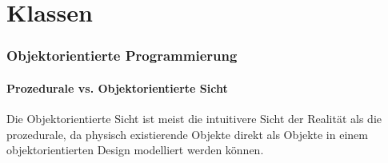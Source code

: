 
\part{Klassen}

\section{Objektorientierte Programmierung}

\subsection{Prozedurale vs. Objektorientierte Sicht}
Die Objektorientierte Sicht ist meist die intuitivere Sicht der Realität als die prozedurale, da physisch existierende Objekte direkt als Objekte in einem objektorientierten Design modelliert werden können.

